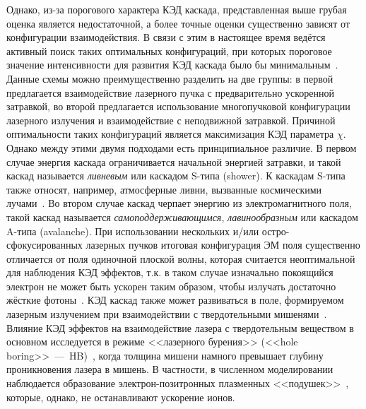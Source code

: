 Однако, из-за порогового характера КЭД каскада, представленная выше грубая оценка является недостаточной, а более точные оценки существенно зависят от конфигурации взаимодействия. 
В связи с этим в настоящее время ведётся активный поиск таких оптимальных конфигураций, при которых пороговое значение интенсивности для развития КЭД каскада было бы минимальным~\cite{Bell2008, bulanov2010multiple,nerush2011analytical, gonoskov2012dipole,gonoskov2013probing,bashmakov2014effect,muraviev2015generation,gelfer2015optimized,Kostyukov2016,grismayer2016laser,grismayer2017seeded,mironov2017observable,jirka2017qed,del2018ion,kostyukov2018growth,Yuan2018,Luo2018,Lu2018,luo2018qed,Martinez2019,Zhang2020}.
Данные схемы можно преимущественно разделить на две группы: в первой предлагается взаимодействие лазерного пучка с предварительно ускоренной затравкой, во второй предлагается использование многопучковой конфигурации лазерного излучения и взаимодействие с неподвижной затравкой.
Причиной оптимальности таких конфигураций является максимизация КЭД параметра $\chi$.
Однако между этими двумя подходами есть принципиальное различие.
В первом случае энергия каскада ограничивается начальной энергией затравки, и такой каскад называется \textit{ливневым} или каскадом S-типа (shower).
К каскадам S-типа также относят, например, атмосферные ливни, вызванные космическими лучами~\cite{rao1998extensive}.
Во втором случае каскад черпает энергию из электромагнитного поля, такой каскад называется \textit{самоподдерживающимся}, \textit{лавинообразным} или каскадом A-типа (avalanche).
При использовании нескольких и/или остро-сфокусированных лазерных пучков итоговая конфигурация ЭМ поля существенно отличается от поля одиночной плоской волны, которая считается неоптимальной для наблюдения КЭД эффектов, т.к. в таком случае изначально покоящийся электрон не может быть ускорен таким образом, чтобы излучать достаточно жёсткие фотоны~\cite{di2012extremely,narozhny2015quantum,mironov2017observable,bulanov2013electromagnetic}.
КЭД каскад также может развиваться в поле, формируемом лазерным излучением при взаимодействии с твердотельными мишенями~\cite{Kostyukov2016}.
Влияние КЭД эффектов на взаимодействие лазера с твердотельным веществом в основном исследуется в режиме <<лазерного бурения>> (<<hole boring>>~---~HB)~\cite{Wilks1992,macchi2013ion}, когда толщина мишени намного превышает глубину проникновения лазера в мишень.
В частности, в численном моделировании~\cite{Ridgers12,Nerush15,Kostyukov2016,del2018ion} наблюдается образование электрон-позитронных плазменных <<подушек>>~\cite{kirk2013pair}, которые, однако, не останавливают ускорение ионов.
